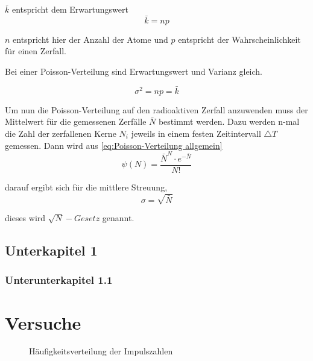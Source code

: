 $\bar{k}$ entspricht dem Erwartungswert 
\begin{equation}
	\bar{k}=np
\end{equation}


$n$ entspricht hier der Anzahl der Atome und $p$ entspricht der
Wahrscheinlichkeit für einen Zerfall.

Bei einer Poisson-Verteilung sind Erwartungswert und Varianz gleich.

\begin{equation}
	\sigma^{2}=np=\bar{k}
\end{equation}


Um nun die Poisson-Verteilung auf den radioaktiven Zerfall anzuwenden
muss der Mittelwert für die gemessenen Zerfälle $\bar{N}$ bestimmt
werden. Dazu werden n-mal die Zahl der zerfallenen Kerne $N_{i}$
jeweils in einem festen Zeitintervall $\triangle T$ gemessen. Dann
wird aus \ref{eq:Poisson-Verteilung allgemein} 
\begin{equation}
	\psi(N)=\frac{\bar{N}^{N}\cdot e^{-\bar{N}}}{N!}
\end{equation}


darauf ergibt sich für die mittlere Streuung,
\[
\sigma=\sqrt{\bar{N}}
\]


dieses wird $\sqrt{N}-Gesetz$ genannt.

\subsection{Unterkapitel 1}
\subsubsection{Unterunterkapitel 1.1}

\section{Versuche}

\begin{figure}[h!]
	\centering
	
	\caption{Häufigkeitsverteilung der Impulszahlen}
\end{figure}
